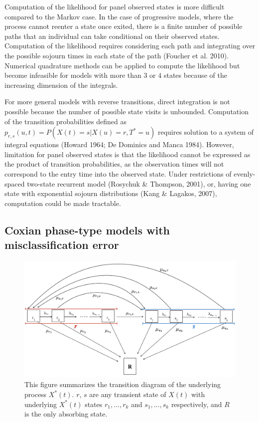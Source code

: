 \documentclass{uwstat572}
\begin{document}
Computation of the likelihood for panel observed states is more difficult compared to the Markov case. In the case of progressive models, where the process cannot reenter a state once exited, there is a finite number of possible paths that an individual can take conditional on their observed states. Computation of the likelihood requires considering each path and integrating over the possible sojourn times in each state of the path (Foucher et al. 2010). Numerical quadrature methods can be applied to compute the likelihood but become infeasible for models with more than $3$ or $4$ states because of the increasing dimension of the integrals.

For more general models with reverse transitions, direct integration is not possible because the number of possible state visits is unbounded. Computation of the transition probabilities defined as $p_{r,s}(u, t ) = P (X (t ) = s|X(u) = r, T^* = u)$ requires solution to a system of integral equations (Howard 1964; De Dominics and Manca 1984). However, limitation for panel observed states is that the likelihood cannot be expressed as the product of transition probabilities, as the observation times will not correspond to the entry time into the observed state. Under restrictions of evenly-spaced two-state recurrent model (Rosychuk \& Thompson, 2001), or, having one state with exponential sojourn distributions (Kang \& Lagakos, 2007), computation could be made tractable.

\subsection{Coxian phase-type models with misclassification error} \label{subsection : coxian}
\begin{figure}[t]
\centering
\includegraphics[scale=0.5]{coxmodelstitched2.png}
\caption{This figure summarizes the transition diagram of the underlying process $X^*(t)$. $r$, $s$ are any transient state of $X(t)$ with underlying $X^*(t)$ states $r_1,\ldots,r_k$ and $s_1,\ldots,s_k$ respectively, and $R$ is the only absorbing state.}
\end{figure}
\end{document}
